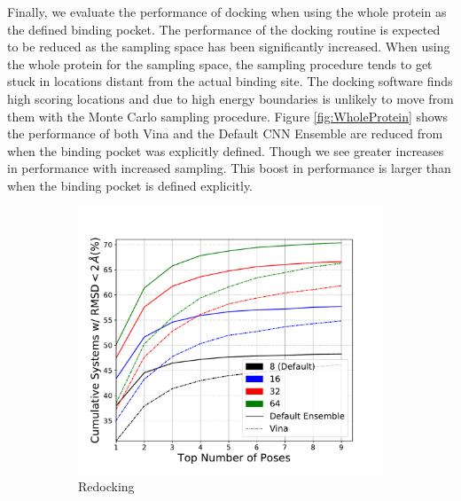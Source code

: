 \documentclass[journal=jcisd8,manuscript=article]{achemso}
\begin{document}
Finally, we evaluate the performance of docking when using the whole protein as the defined binding pocket. The performance of the docking routine is expected to be reduced as the sampling space has been significantly increased. When using the whole protein for the sampling space, the sampling procedure tends to get stuck in locations distant from the actual binding site. The docking software finds high scoring locations and due to high energy boundaries is unlikely to move from them with the Monte Carlo sampling procedure. Figure \ref{fig:WholeProtein} shows the performance of both Vina and the Default CNN Ensemble are reduced from when the binding pocket was explicitly defined. Though we see greater increases in performance with increased sampling. This boost in performance is larger than when the binding pocket is defined explicitly. 
\begin{figure}    
        \begin{subfigure}[b]{0.48\textwidth}    
    		\centering
    		\includegraphics[width=\textwidth]{figures/redocking/whole_ptn_sweep_exhaustiveness_line.pdf}
    		\caption{Redocking}
            \label{fig:WholeProteinExhRD}
        \end{subfigure}    
        \begin{subfigure}[b]{0.48\textwidth}    
    		\centering

\end{subfigure}
\end{figure}
\end{document}
